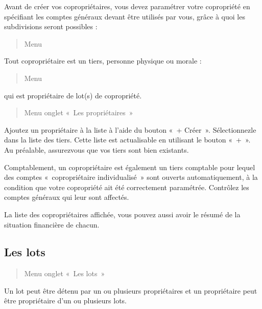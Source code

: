 \documentclass[a4paper,10pt,oneside,french]{sphinxmanual}
\begin{document}
Avant de créer vos copropriétaires, vous devez paramétrer votre copropriété en spécifiant les comptes généraux devant être utilisés par vous, grâce à quoi les subdivisions seront possibles :
\begin{quote}

Menu 
\end{quote}

Tout copropriétaire est un tiers, personne physique ou morale :
\begin{quote}

Menu 
\end{quote}

qui est propriétaire de lot(s) de copropriété.
\begin{quote}

Menu  \sphinxhyphen{} onglet « Les propriétaires »
\end{quote}

Ajoutez un propriétaire à la liste à l’aide du bouton « + Créer ».
Sélectionnez\sphinxhyphen{}le dans la liste des tiers. Cette liste est actualisable en utilisant le bouton « + ». Au préalable, assurez\sphinxhyphen{}vous que vos tiers sont bien existants.

Comptablement, un copropriétaire est également un tiers comptable pour lequel des comptes « copropriétaire individualisé » sont ouverts automatiquement, à la condition que votre copropriété ait été correctement paramétrée. Contrôlez les comptes généraux qui leur sont affectés.

La liste des copropriétaires affichée, vous pouvez aussi avoir le résumé de la situation financière de chacun.


\subsection{Les lots}
\label{\detokenize{condominium/owners:les-lots}}\begin{quote}

Menu  \sphinxhyphen{} onglet « Les lots »
\end{quote}

Un lot peut être détenu par un ou plusieurs propriétaires et un propriétaire peut être propriétaire d’un ou plusieurs lots.
\end{document}
